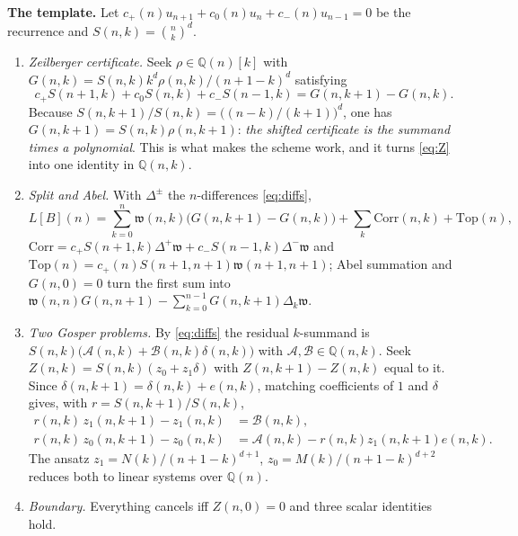 \documentclass[11pt,reqno]{amsart}
\theoremstyle{plain}
\theoremstyle{definition}
\theoremstyle{remark}
\newcommand{\Q}{\mathbb{Q}}
\newcommand{\bin}[2]{\binom{#1}{#2}}
\numberwithin{equation}{section}
\begin{document}
\medskip\noindent\textbf{The template.} Let $c_+(n)u_{n+1}+c_0(n)u_n+c_-(n)u_{n-1}=0$ be the
recurrence and $S(n,k)=\bin nk^d$.
\begin{enumerate}[leftmargin=2em,label=(\arabic*)]
\item \emph{Zeilberger certificate.} Seek $\rho\in\Q(n)[k]$ with
  $G(n,k)=S(n,k)k^d\rho(n,k)/(n+1-k)^d$ satisfying
  \begin{equation}\label{eq:Z}
    c_+S(n+1,k)+c_0S(n,k)+c_-S(n-1,k)=G(n,k+1)-G(n,k).
  \end{equation}
  Because $S(n,k+1)/S(n,k)=\bigl((n-k)/(k+1)\bigr)^d$, one has
  $G(n,k+1)=S(n,k)\rho(n,k+1)$: \emph{the shifted certificate is the summand times a
  polynomial}. This is what makes the scheme work, and it turns \eqref{eq:Z} into one
  identity in $\Q(n,k)$.
\item \emph{Split and Abel.} With $\Delta^{\pm}$ the $n$-differences \eqref{eq:diffs},
  \[
    L[B](n)=\sum_{k=0}^{n}\mathfrak w(n,k)\bigl(G(n,k+1)-G(n,k)\bigr)
            +\sum_{k}\mathrm{Corr}(n,k)+\mathrm{Top}(n),
  \]
  $\mathrm{Corr}=c_+S(n+1,k)\Delta^+\mathfrak w+c_-S(n-1,k)\Delta^-\mathfrak w$ and
  $\mathrm{Top}(n)=c_+(n)S(n+1,n+1)\mathfrak w(n+1,n+1)$; Abel summation and $G(n,0)=0$
  turn the first sum into
  $\mathfrak w(n,n)G(n,n+1)-\sum_{k=0}^{n-1}G(n,k+1)\Delta_k\mathfrak w$.
\item \emph{Two Gosper problems.} By \eqref{eq:diffs} the residual $k$-summand is
  $S(n,k)\bigl(\mathcal A(n,k)+\mathcal B(n,k)\delta(n,k)\bigr)$ with
  $\mathcal A,\mathcal B\in\Q(n,k)$. Seek $Z(n,k)=S(n,k)(z_0+z_1\delta)$ with
  $Z(n,k+1)-Z(n,k)$ equal to it. Since $\delta(n,k+1)=\delta(n,k)+e(n,k)$, matching
  coefficients of $1$ and $\delta$ gives, with $r=S(n,k+1)/S(n,k)$,
  \begin{align}
    r(n,k)\,z_1(n,k+1)-z_1(n,k)&=\mathcal B(n,k),\label{eq:G1}\\
    r(n,k)\,z_0(n,k+1)-z_0(n,k)&=\mathcal A(n,k)-r(n,k)z_1(n,k+1)e(n,k).\label{eq:G2}
  \end{align}
  The ansatz $z_1=N(k)/(n+1-k)^{d+1}$, $z_0=M(k)/(n+1-k)^{d+2}$ reduces both to linear
  systems over $\Q(n)$.
\item \emph{Boundary.} Everything cancels iff $Z(n,0)=0$ and three scalar identities hold.
\end{enumerate}
\end{document}
